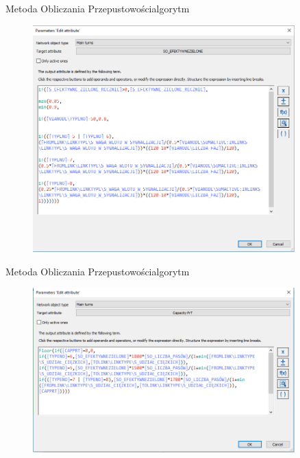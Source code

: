 \documentclass[8pt]{beamer}
\begin{document}
\begin{frame}{Metoda Obliczania Przepustowości}{algorytm}
\begin{figure}\begin{center}
\includegraphics[width=0.9\textwidth]{algo}
 \end{center}  \end{figure} 
\end{frame}

\begin{frame}{Metoda Obliczania Przepustowości}{algorytm}
\begin{figure}\begin{center}
\includegraphics[width=0.9\textwidth]{algo2}
 \end{center}  \end{figure} 
\end{frame}
\end{document}
